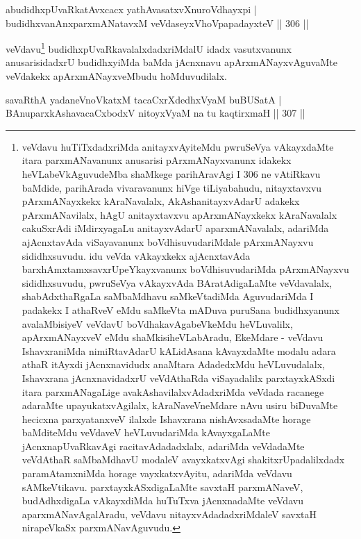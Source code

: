 
\begin{shl}
abudidhxpUvaRkatAvxcacx yathAvasatxvXnuroVdhayxpi |
budidhxvanAnxparxmANatavxM veVdaseyxVhoVpapadayxteV \hfill || 306 ||
\end{shl}

\begin{artha}
veVdavu\footnote{veVdavu huTiTxdadxriMda anitayxvAyiteMdu pwruSeVya vAkayxdaMte itara parxmANavanunx anusarisi pArxmANayxvanunx idakekx heVLabeVkAguvudeMba shaMkege parihAravAgi I 306 ne vAtiRkavu baMdide, parihArada vivaravanunx hiVge tiLiyabahudu, nitayxtavxvu pArxmANayxkekx kAraNavalalx, AkAshanitayxvAdarU adakekx pArxmANavilalx, hAgU anitayxtavxvu apArxmANayxkekx kAraNavalalx cakuSxrAdi iMdirxyagaLu anitayxvAdarU aparxmANavalalx, adariMda ajAcnxtavAda viSayavanunx boVdhisuvudariMdale pArxmANayxvu sididhxsuvudu. idu veVda vAkayxkekx ajAcnxtavAda barxhAmxtamxsavxrUpeYkayxvanunx boVdhisuvudariMda pArxmANayxvu sididhxsuvudu, pwruSeVya vAkayxvAda BAratAdigaLaMte veVdavalalx, shabAdxthaRgaLa saMbaMdhavu saMkeVtadiMda AguvudariMda I padakekx I athaRveV eMdu saMkeVta mADuva puruSana budidhxyanunx avalaMbisiyeV veVdavU boVdhakavAgabeVkeMdu heVLuvalilx, apArxmANayxveV eMdu shaMkisiheVLabAradu, EkeMdare - veVdavu IshavxraniMda nimiRtavAdarU kALidAsana kAvayxdaMte modalu adara athaR itAyxdi jAcnxnavidudx anaMtara AdadedxMdu heVLuvudalalx, Ishavxrana jAcnxnavidadxrU veVdAthaRda viSayadalilx parxtayxkASxdi itara parxmANagaLige avakAshavilalxvAdadxriMda veVdada racanege adaraMte upayukatxvAgilalx, kAraNaveVneMdare nAvu usiru biDuvaMte hecicxna parxyatanxveV ilalxde Ishavxrana nishAvxsadaMte horage baMditeMdu veVdaveV heVLuvudariMda kAvayxgaLaMte jAcnxnapUvaRkavAgi racitavAdadadxlalx, adariMda veVdadaMte veVdAthaR saMbaMdhavU modaleV avayxkatxvAgi shakitxrUpadalilxdadx paramAtamxniMda horage vayxkatxvAyitu, adariMda veVdavu sAMkeVtikavu. parxtayxkASxdigaLaMte savxtaH parxmANaveV, budAdhxdigaLa vAkayxdiMda huTuTxva jAcnxnadaMte veVdavu aparxmANavAgalAradu, veVdavu nitayxvAdadadxriMdaleV savxtaH nirapeVkaSx parxmANavAguvudu.} budidhxpUvaRkavalalxdadxriMdalU idadx vasutxvanunx anusarisidadxrU budidhxyiMda baMda jAcnxnavu apArxmANayxvAguvaMte veVdakekx apArxmANayxveMbudu hoMduvudilalx.
\end{artha}

\begin{shl}
savaRthA yadaneVnoVkatxM tacaCxrXdedhxVyaM buBUSatA |
BAnuparxkAshavacaCxbodxV nitoyxV\s yaM na tu kaqtirxmaH \hfill || 307 ||
\end{shl}

